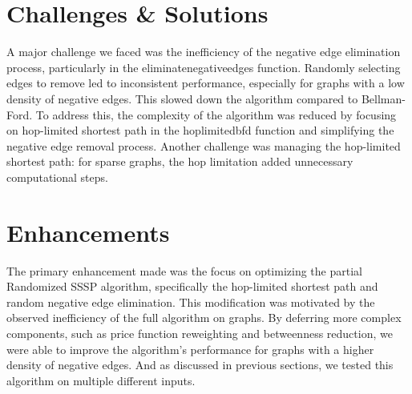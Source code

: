 \documentclass[12pt]{article}
\begin{document}
\section{Challenges \& Solutions}

A major challenge we faced was the inefficiency of the negative edge elimination process, particularly in the eliminatenegativeedges function. Randomly selecting edges to remove led to inconsistent performance, especially for graphs with a low density of negative edges. This slowed down the algorithm compared to Bellman-Ford. To address this, the complexity of the algorithm was reduced by focusing on hop-limited shortest path in the hoplimitedbfd function and simplifying the negative edge removal process. Another challenge was managing the hop-limited shortest path: for sparse graphs, the hop limitation added unnecessary computational steps.


\section{Enhancements}

The primary enhancement made was the focus on optimizing the partial Randomized SSSP algorithm, specifically the hop-limited shortest path and random negative edge elimination. This modification was motivated by the observed inefficiency of the full algorithm on graphs. By deferring more complex components, such as price function reweighting and betweenness reduction, we were able to improve the algorithm's performance for graphs with a higher density of negative edges. And as discussed in previous sections, we tested this algorithm on multiple different inputs.
\end{document}
